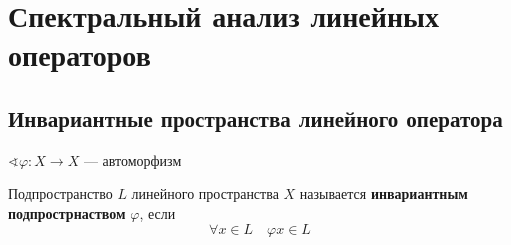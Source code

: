 

\cfoot{}



\section{Спектральный анализ линейных операторов}

\subsection{Инвариантные пространства линейного оператора}

$\sphericalangle \varphi : X\to X$ --- автоморфизм

\begin{definition}
    Подпространство $L$ линейного пространства $X$ называется \textbf{инвариантным подпрострнаством} $\varphi$, если
    $$\forall x\in L \quad \varphi x \in L$$
\end{definition}
